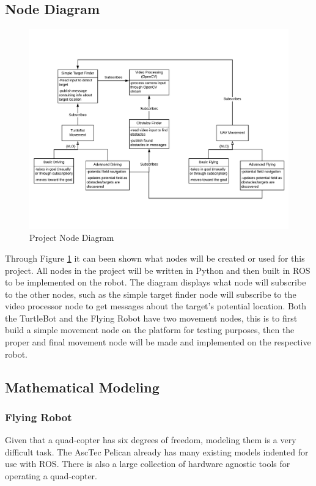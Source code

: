\documentclass{article}
\begin{document}
	\subsection{Node Diagram}

	\begin{figure}[H]
		\centering
		\includegraphics[width=0.9\linewidth]{NodeDiagram}
		\caption{Project Node Diagram}
		\label{fig:nodediagram}
	\end{figure}

	Through Figure \ref{fig:nodediagram} it can been shown what nodes will be created or used for this project. All nodes in the project will be written in Python and then built in ROS to be implemented on the robot. The diagram displays what node will subscribe to the other nodes, such as the simple target finder node will subscribe to the video processor node to get messages about the target's potential location. Both the TurtleBot and the Flying Robot have two movement nodes, this is to first build a simple movement node on the platform for testing purposes, then the proper and final movement node will be made and implemented on the respective robot. 
	
	\subsection{Mathematical Modeling}
	
		\subsubsection{Flying Robot}
	
		Given that a quad-copter has six degrees of freedom, modeling them is a very difficult task. The AscTec Pelican already has many existing models indented for use with ROS. There is also a large collection of hardware agnostic tools for operating a quad-copter.
	
\end{document}
